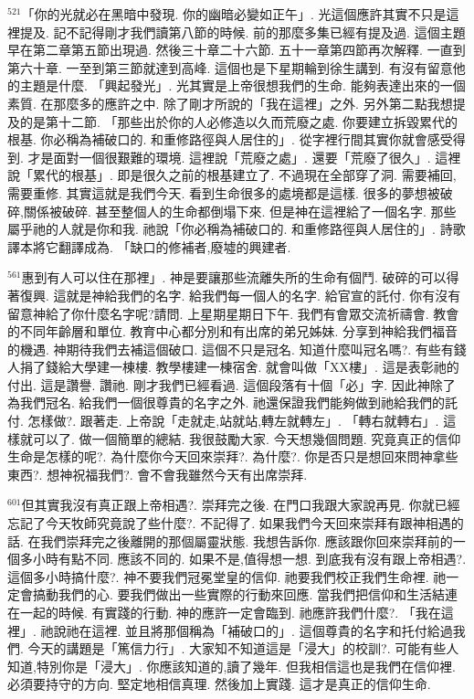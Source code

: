 \documentclass{book}
\begin{document}
$^{521}$「你的光就必在黑暗中發現.
你的幽暗必變如正午」.
光這個應許其實不只是這裡提及.
記不記得剛才我們讀第八節的時候.
前的那麼多集已經有提及過.
這個主題早在第二章第五節出現過.
然後三十章二十六節.
五十一章第四節再次解釋.
一直到第六十章.
一至到第三節就達到高峰.
這個也是下星期輪到徐生講到.
有沒有留意他的主題是什麼.
「興起發光」.
光其實是上帝很想我們的生命.
能夠表達出來的一個素質.
在那麼多的應許之中.
除了剛才所說的「我在這裡」之外.
另外第二點我想提及的是第十二節.
「那些出於你的人必修造以久而荒廢之處.
你要建立拆毀累代的根基.
你必稱為補破口的.
和重修路徑與人居住的」.
從字裡行間其實你就會感受得到.
才是面對一個很艱難的環境.
這裡說「荒廢之處」.
還要「荒廢了很久」.
這裡說「累代的根基」.
即是很久之前的根基建立了.
不過現在全部穿了洞.
需要補回,需要重修.
其實這就是我們今天.
看到生命很多的處境都是這樣.
很多的夢想被破碎,關係被破碎.
甚至整個人的生命都倒塌下來.
但是神在這裡給了一個名字.
那些屬乎祂的人就是你和我.
祂說「你必稱為補破口的.
和重修路徑與人居住的」.
詩歌譯本將它翻譯成為.
「缺口的修補者,廢墟的興建者.

$^{561}$惠到有人可以住在那裡」.
神是要讓那些流離失所的生命有個鬥.
破碎的可以得著復興.
這就是神給我們的名字.
給我們每一個人的名字.
給官宣的託付.
你有沒有留意神給了你什麼名字呢?請問.
上星期星期日下午.
我們有會眾交流祈禱會.
教會的不同年齡層和單位.
教育中心都分別和有出席的弟兄姊妹.
分享到神給我們福音的機遇.
神期待我們去補這個破口.
這個不只是冠名.
知道什麼叫冠名嗎?.
有些有錢人捐了錢給大學建一棟樓.
教學樓建一棟宿舍.
就會叫做「XX樓」.
這是表彰祂的付出.
這是讚譽.
讚祂.
剛才我們已經看過.
這個段落有十個「必」字.
因此神除了為我們冠名.
給我們一個很尊貴的名字之外.
祂還保證我們能夠做到祂給我們的託付.
怎樣做?.
跟著走.
上帝說「走就走,站就站,轉左就轉左」.
「轉右就轉右」.
這樣就可以了.
做一個簡單的總結.
我很鼓勵大家.
今天想幾個問題.
究竟真正的信仰生命是怎樣的呢?.
為什麼你今天回來崇拜?.
為什麼?.
你是否只是想回來問神拿些東西?.
想神祝福我們?.
會不會我雖然今天有出席崇拜.

$^{601}$但其實我沒有真正跟上帝相遇?.
崇拜完之後.
在門口我跟大家說再見.
你就已經忘記了今天牧師究竟說了些什麼?.
不記得了.
如果我們今天回來崇拜有跟神相遇的話.
在我們崇拜完之後離開的那個屬靈狀態.
我想告訴你.
應該跟你回來崇拜前的一個多小時有點不同.
應該不同的.
如果不是,值得想一想.
到底我有沒有跟上帝相遇?.
這個多小時搞什麼?.
神不要我們冠冕堂皇的信仰.
祂要我們校正我們生命裡.
祂一定會搞動我們的心.
要我們做出一些實際的行動來回應.
當我們把信仰和生活結連在一起的時候.
有實踐的行動.
神的應許一定會臨到.
祂應許我們什麼?.
「我在這裡」.
祂說祂在這裡.
並且將那個稱為「補破口的」.
這個尊貴的名字和托付給過我們.
今天的講題是「篤信力行」.
大家知不知道這是「浸大」的校訓?.
可能有些人知道,特別你是「浸大」.
你應該知道的,讀了幾年.
但我相信這也是我們在信仰裡.
必須要持守的方向.
堅定地相信真理.
然後加上實踐.
這才是真正的信仰生命.
\newpage
\end{document}
